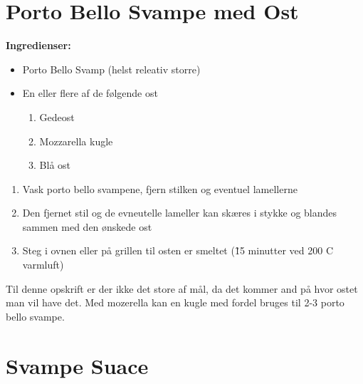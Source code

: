 \documentclass{book}
\begin{document}
\newpage 
{}
\newpage\section{Porto Bello Svampe med Ost}
\begin{minipage}[t]{0.5\textwidth}
\textbf{Ingredienser:}
\begin{itemize}
    \item Porto Bello Svamp (helst releativ storre)
    \item En eller flere af de følgende ost
    \begin{enumerate}
        \item Gedeost
        \item Mozzarella kugle
        \item Blå ost
    \end{enumerate}
\end{itemize}
\end{minipage}
\begin{minipage}[t]{0.5\textwidth}
\begin{enumerate}
    \item Vask porto bello svampene, fjern  stilken og eventuel lamellerne
    \item Den fjernet stil og de evneutelle lameller kan skæres i stykke og blandes sammen med den ønskede ost
    \item Steg i ovnen eller på grillen til osten er smeltet (\~15 minutter ved 200 \degree C varmluft)
\end{enumerate}
\end{minipage}
Til denne opskrift er der ikke det store af mål, da det kommer and på hvor ostet man vil have det. Med mozerella kan en kugle med fordel bruges til 2-3 porto bello svampe.

\newpage \section{Svampe Suace}
\end{document}
